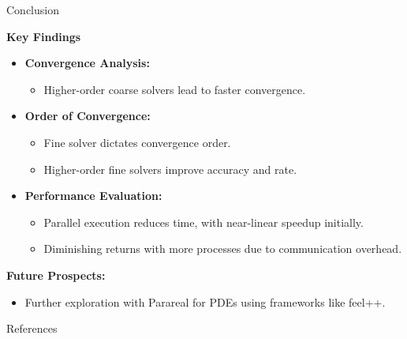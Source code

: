\documentclass[aspectratio=169,xcolor=dvipsnames, t]{beamer}
\begin{document}
\begin{frame}{Conclusion}
    \begin{block}{\textbf{Key Findings}}
        \begin{itemize}
            \item \textbf{Convergence Analysis:} 
                \begin{itemize}
                    \item Higher-order coarse solvers lead to faster convergence.
                \end{itemize}
            \item \textbf{Order of Convergence:} 
                \begin{itemize}
                    \item Fine solver dictates convergence order.
                    \item Higher-order fine solvers improve accuracy and rate.
                \end{itemize}
            \item \textbf{Performance Evaluation:} 
                \begin{itemize}
                    \item Parallel execution reduces time, with near-linear speedup initially.
                    \item Diminishing returns with more processes due to communication overhead.
                \end{itemize}
        \end{itemize}
    \end{block}
    
    \textbf{Future Prospects:}
    \begin{itemize}
    \item Further exploration with Parareal for PDEs using frameworks like feel++.
    \end{itemize}
\end{frame}
\begin{frame}[allowframebreaks]{References}
    \printbibliography
	
\end{frame}

\makefinalpage
\end{document}
